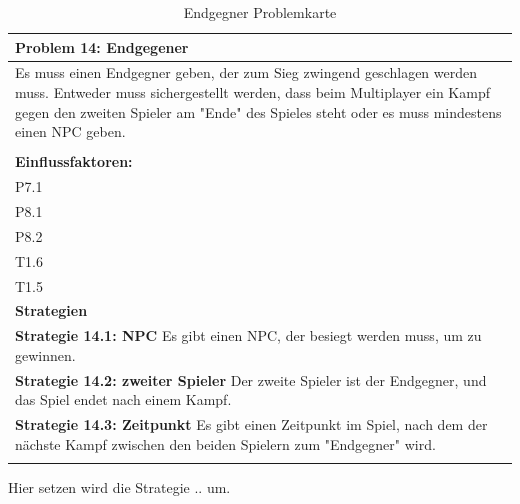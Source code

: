 \documentclass[fontsize=12pt,paper=a4,twoside]{scrartcl}
\begin{document}
\begin{table}[H]
    \centering
    \begin{tabular}{|p{15cm}|}
    \hline
          \textbf{Problem 14: Endgegener}  \\ \hline
	Es muss einen Endgegner geben, der zum Sieg zwingend geschlagen werden muss. Entweder muss sichergestellt werden, dass beim Multiplayer ein Kampf gegen den zweiten Spieler am "Ende" des Spieles steht oder es muss mindestens einen NPC geben. \\
         \\ \hline
          \textbf{Einflussfaktoren: } \\
	P7.1 \\
	P8.1 \\
	P8.2 \\
	T1.6 \\
	T1.5 \\
          \hline
          \textbf{Strategien} \\ \hline
            {}          
           \label{strategie:14.1}     
          \textbf{Strategie 14.1: NPC} Es gibt einen NPC, der besiegt werden muss, um zu gewinnen.  \\        
  {}          
           \label{strategie:14.2}              
          \textbf{Strategie 14.2: zweiter Spieler} Der zweite Spieler ist der Endgegner, und das Spiel endet nach einem Kampf.  \\
	 {}          
           \label{strategie:14.3}     
          \textbf{Strategie 14.3: Zeitpunkt} Es gibt einen Zeitpunkt im Spiel, nach dem der nächste Kampf zwischen den beiden Spielern zum "Endgegner" wird.  \\ 
	 \\ \hline
    \end{tabular}

    \caption{Endgegner Problemkarte}
    \label{tab:ProblemKarte14}
\end{table}
Hier setzen wird die Strategie .. um. \\
\end{document}
